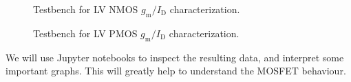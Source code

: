 \documentclass[
  a4paper,
  DIV=11,
  numbers=noendperiod]{scrartcl}
\begin{document}
\begin{figure}


\caption{\label{fig-techsweep-nmos-tb}Testbench for LV NMOS
\(g_\mathrm{m}/I_\mathrm{D}\) characterization.}

\end{figure}%

\begin{figure}


\caption{\label{fig-techsweep-pmos-tb}Testbench for LV PMOS
\(g_\mathrm{m}/I_\mathrm{D}\) characterization.}

\end{figure}%

We will use Jupyter notebooks to inspect the resulting data, and
interpret some important graphs. This will greatly help to understand
the MOSFET behaviour.
\end{document}
